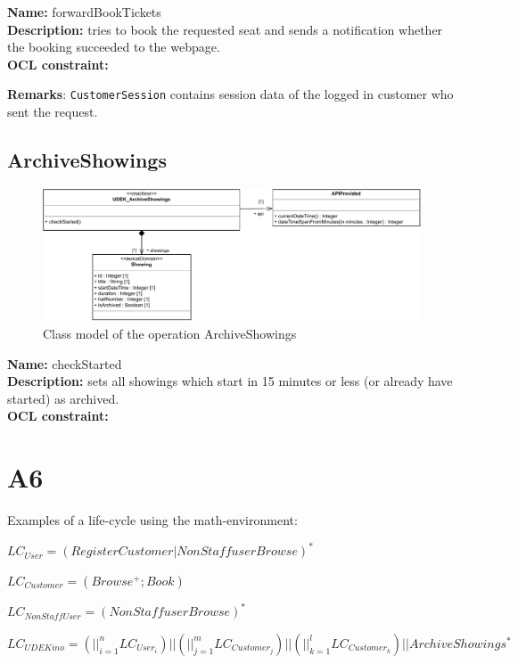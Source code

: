 \documentclass[a4paper,10pt,titlepage,bibtotoc,bibtotocnumbered]{scrreprt}
\begin{document}
\textbf{Name:} forwardBookTickets
\\
\textbf{Description:} tries to book the requested seat and sends a notification whether the booking succeeded to the webpage.
\\
\textbf{OCL constraint:}

\textbf{Remarks}: \lstinline|CustomerSession| contains session data of the logged in customer who sent the request.

\subsection{ArchiveShowings}

\begin{figure}[H]
    \centering
    \includegraphics[width = \textwidth]{figures/07/a07_class_diagram_ArchiveShowings.pdf}
    \caption{Class model of the operation ArchiveShowings}
    \label{figure:operation_ArchiveShowings_class_diagram}
\end{figure}

\textbf{Name:} checkStarted
\\
\textbf{Description:} sets all showings which start in 15 minutes or less (or already have started) as archived.
\\
\textbf{OCL constraint:}


\newpage\section{A6}

Examples of a life-cycle using the math-environment:

$LC_{User}=(RegisterCustomer|NonStaffuserBrowse)^*$

$LC_{Customer}=(Browse^+;Book)$

$LC_{NonStaffUser}=(NonStaffuserBrowse)^*$

$LC_{UDEKino}=(||_{i=1}^{n}LC_{User_i})||(||_{j=1}^{m}LC_{Customer_j})||(||_{k=1}^{l}LC_{Customer_k})||ArchiveShowings^*$
\end{document}
